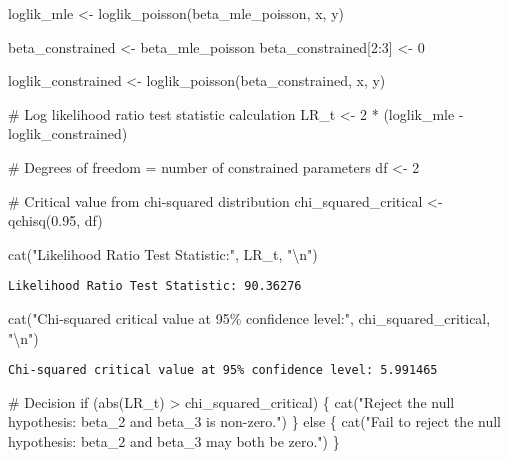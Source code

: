 \documentclass[
  letterpaper,
  DIV=11,
  numbers=noendperiod]{scrartcl}
\newenvironment{Shaded}{\begin{snugshade}}{\end{snugshade}}
\newcommand{\CommentTok}[1]{\textcolor[rgb]{0.37,0.37,0.37}{#1}}
\newcommand{\ControlFlowTok}[1]{\textcolor[rgb]{0.00,0.23,0.31}{#1}}
\newcommand{\DecValTok}[1]{\textcolor[rgb]{0.68,0.00,0.00}{#1}}
\newcommand{\FloatTok}[1]{\textcolor[rgb]{0.68,0.00,0.00}{#1}}
\newcommand{\FunctionTok}[1]{\textcolor[rgb]{0.28,0.35,0.67}{#1}}
\newcommand{\NormalTok}[1]{\textcolor[rgb]{0.00,0.23,0.31}{#1}}
\newcommand{\OtherTok}[1]{\textcolor[rgb]{0.00,0.23,0.31}{#1}}
\newcommand{\SpecialCharTok}[1]{\textcolor[rgb]{0.37,0.37,0.37}{#1}}
\newcommand{\StringTok}[1]{\textcolor[rgb]{0.13,0.47,0.30}{#1}}
\begin{document}
\begin{Shaded}
\begin{Highlighting}[]
\NormalTok{loglik\_mle }\OtherTok{\textless{}{-}} \FunctionTok{loglik\_poisson}\NormalTok{(beta\_mle\_poisson, x, y)}

\NormalTok{beta\_constrained }\OtherTok{\textless{}{-}}\NormalTok{ beta\_mle\_poisson}
\NormalTok{beta\_constrained[}\DecValTok{2}\SpecialCharTok{:}\DecValTok{3}\NormalTok{] }\OtherTok{\textless{}{-}} \DecValTok{0}

\NormalTok{loglik\_constrained }\OtherTok{\textless{}{-}} \FunctionTok{loglik\_poisson}\NormalTok{(beta\_constrained, x, y)}

\CommentTok{\# Log likelihood ratio test statistic calculation}
\NormalTok{LR\_t }\OtherTok{\textless{}{-}} \DecValTok{2} \SpecialCharTok{*}\NormalTok{ (loglik\_mle }\SpecialCharTok{{-}}\NormalTok{ loglik\_constrained)}

\CommentTok{\# Degrees of freedom = number of constrained parameters}
\NormalTok{df }\OtherTok{\textless{}{-}} \DecValTok{2}

\CommentTok{\# Critical value from chi{-}squared distribution}
\NormalTok{chi\_squared\_critical }\OtherTok{\textless{}{-}} \FunctionTok{qchisq}\NormalTok{(}\FloatTok{0.95}\NormalTok{, df)}

\FunctionTok{cat}\NormalTok{(}\StringTok{"Likelihood Ratio Test Statistic:"}\NormalTok{, LR\_t, }\StringTok{"}\SpecialCharTok{\textbackslash{}n}\StringTok{"}\NormalTok{)}
\end{Highlighting}
\end{Shaded}

\begin{verbatim}
Likelihood Ratio Test Statistic: 90.36276 
\end{verbatim}

\begin{Shaded}
\begin{Highlighting}[]
\FunctionTok{cat}\NormalTok{(}\StringTok{"Chi{-}squared critical value at 95\% confidence level:"}\NormalTok{, chi\_squared\_critical, }\StringTok{"}\SpecialCharTok{\textbackslash{}n}\StringTok{"}\NormalTok{)}
\end{Highlighting}
\end{Shaded}

\begin{verbatim}
Chi-squared critical value at 95% confidence level: 5.991465 
\end{verbatim}

\begin{Shaded}
\begin{Highlighting}[]
\CommentTok{\# Decision}
\ControlFlowTok{if}\NormalTok{ (}\FunctionTok{abs}\NormalTok{(LR\_t) }\SpecialCharTok{\textgreater{}}\NormalTok{ chi\_squared\_critical) \{}
  \FunctionTok{cat}\NormalTok{(}\StringTok{"Reject the null hypothesis: beta\_2 and beta\_3 is non{-}zero."}\NormalTok{)}
\NormalTok{  \} }\ControlFlowTok{else}\NormalTok{ \{}
  \FunctionTok{cat}\NormalTok{(}\StringTok{"Fail to reject the null hypothesis: beta\_2 and beta\_3 may both be zero."}\NormalTok{)}
\NormalTok{    \}}
\end{Highlighting}
\end{Shaded}
\end{document}
